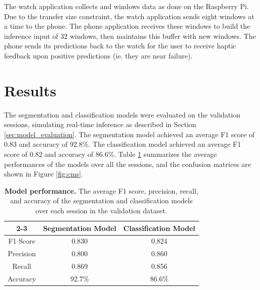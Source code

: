 \documentclass[conference]{IEEEtran}
\begin{document}
The watch application collects and windows data as done on the Raspberry Pi. Due to the transfer size constraint, the watch application sends eight windows at a time to the phone. The phone application receives these windows to build the inference input of 32 windows, then maintains this buffer with new windows. The phone sends its predictions back to the watch for the user to receive haptic feedback upon positive predictions (ie. they are near failure).

\section{Results}
The segmentation and classification models were evaluated on the validation sessions, simulating real-time inference as described in Section \ref{sec:model_evaluation}. The segmentation model achieved an average F1 score of 0.83 and accuracy of 92.8\%. The classification model achieved an average F1 score of 0.82 and accuracy of 86.6\%. Table \ref{tab:eval} summarizes the average performances of the models over all the sessions, and the confusion matrices are shown in Figure \ref{fig:cms}.

\begin{table}[]
    \centering
    
    \renewcommand{\arraystretch}{1.5}
    \begin{tabular}{c|c|c|}
        \cline{2-3}
        & Segmentation Model  & Classification Model  \\ \hline
        \multicolumn{1}{|c|}{F1 Score}  & 0.830        & 0.824          \\ \hline
        \multicolumn{1}{|c|}{Precision} & 0.800        & 0.860          \\ \hline
        \multicolumn{1}{|c|}{Recall}    & 0.869        & 0.856          \\ \hline
        \multicolumn{1}{|c|}{Accuracy}  & 92.7\%       & 86.6\%         \\ \hline
    \end{tabular}
    \caption{\textbf{Model performance.} The average F1 score, precision, recall, and accuracy of the segmentation and classification models over each session in the validation dataset.}
    \label{tab:eval}
\end{table}
\end{document}
